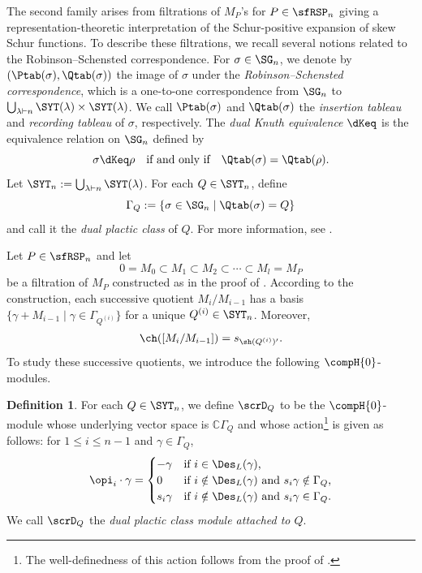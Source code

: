 \documentclass[12pt, reqno]{amsart}
\theoremstyle{plain}
\theoremstyle{definition}
\newtheorem{definition}[definition]{Definition}
\numberwithin{equation}{section}
\numberwithin{figure}{section}
\numberwithin{table}{section}
\def\C{\mathbb C}
\begin{document}
 
The second family arises from filtrations of $M_P$'s for $P \in \sfRSP_n$ giving a representation-theoretic interpretation of the Schur-positive expansion of skew Schur functions.
To describe these filtrations, we recall several notions related to the Robinson--Schensted correspondence.
For $\sigma \in \SG_n$, we denote by $(\Ptab(\sigma), \Qtab(\sigma))$ the image of $\sigma$ under the \emph{Robinson–Schensted correspondence}, which is  a one-to-one correspondence from $\SG_n$ to $\bigcup_{\lambda \vdash n} \SYT(\lambda) \times \SYT(\lambda)$.
We call $\Ptab(\sigma)$ and $\Qtab(\sigma)$ the \emph{insertion tableau} and \emph{recording tableau} of $\sigma$, respectively.
The \emph{dual Knuth equivalence} $\dKeq$ is the equivalence relation on $\SG_n$ defined by
\[
\sigma \dKeq \rho \quad\text{if and only if}\quad \Qtab(\sigma) = \Qtab(\rho).
\]
Let $\SYT_n := \bigcup_{\lambda \vdash n} \SYT(\lambda)$.
For each $Q \in \SYT_n$, define
\[
\Gamma_Q := \{\sigma \in \SG_n \mid \Qtab(\sigma) = Q \}
\]
and call it the \emph{dual plactic class} of $Q$.
For more information, see \cite{05BB, 91Sag, 99Stanley}.



Let $P \in \sfRSP_n$ and 
let \begin{equation}\label{eq: dist filt for M P}
0 = M_0 \subset M_1 \subset M_2 \subset \cdots \subset M_l = M_P
\end{equation}
be a filtration of $M_P$ constructed as in the proof of \cite[Theorem~6.7]{23KLO}. 
According to the construction, each successive quotient  $M_i/M_{i-1}$ has a basis $\{\gamma + M_{i-1} \mid \gamma \in \Gamma_{Q^{(i)}}\}$ for a unique $Q^{(i)} \in \SYT_n$.
Moreover,
\begin{align}\label{eq: character Mi Mi-1 Schur}
\ch([M_i/M_{i-1}]) = s_{\sh(Q^{(i)})'}.
\end{align}
To study these successive quotients, we introduce the following $\compH{0}$-modules. 


\begin{definition}\label{def: def of X Q}
For each $Q \in \SYT_n$, we define $\scrD_Q$ to be the $\compH{0}$-module whose underlying vector
space is $\C\Gamma_Q$ and whose action\footnote{
The well-definedness of this action follows from the proof of \cite[Theorem 6.7]{23KLO}. }
is given as follows: for $1 \leq i \leq n-1$ and $\gamma \in \Gamma_Q$,
\begin{align}\label{eq: action on DQ}
\opi_i \cdot \gamma =
\begin{cases}
- \gamma & \text{if $i \in \Des_L(\gamma)$,}\\
0 & \text{if $i  \notin \Des_L(\gamma)$ and $s_i \gamma \notin \Gamma_Q$,}\\
s_i \gamma & \text{if $i \notin \Des_L(\gamma)$ and $s_i \gamma \in \Gamma_Q$.}
\end{cases}
\end{align}
We call  $\scrD_Q$ the  \emph{dual plactic class module attached to $Q$}.
\end{definition}
\end{document}

